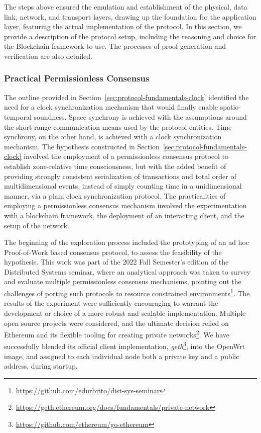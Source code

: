 The steps above ensured the emulation and establishment of the physical, data link, network, and transport layers, drawing up the foundation for the application layer, featuring the actual implementation of the \pol{} protocol. In this section, we provide a description of the protocol setup, including the reasoning and choice for the Blockchain framework to use. The processes of proof generation and verification are also detailed.

\subsubsection{Practical Permissionless Consensus} \label{sec:pol-implementation:practical-permissionless-consensus}

The outline provided in Section~\ref{sec:protocol-fundamentals-clock} identified the need for a clock synchronization mechanism that would finally enable spatio-temporal soundness. Space synchrony is achieved with the assumptions around the short-range communication means used by the protocol entities. Time synchrony, on the other hand, is achieved with a clock synchronization mechanism. The hypothesis constructed in Section~\ref{sec:protocol-fundamentals-clock} involved the employment of a permissionless consensus protocol to establish zone-relative time consciousness, but with the added benefit of providing strongly consistent serialization of transactions and total order of multidimensional events, instead of simply counting time in a unidimensional manner, via a plain clock synchronization protocol. The practicalities of employing a permissionless consensus mechanism involved the experimentation with a blockchain framework, the deployment of an interacting client, and the setup of the network.

The beginning of the exploration process included the prototyping of an ad hoc Proof-of-Work based consensus protocol, to assess the feasibility of the hypothesis. This work was part of the 2022 Fall Semester's edition of the Distributed Systems seminar, where an analytical approach was taken to survey and evaluate multiple permissionless consensus mechanisms, pointing out the challenges of porting such protocols to resource constrained environments\footnote{\url{https://github.com/edurbrito/dist-sys-seminar}}. The results of the experiment were sufficiently encouraging to warrant the development or choice of a more robust and scalable implementation. Multiple open source projects were considered, and the ultimate decision relied on Ethereum and its flexible tooling for creating private networks\footnote{\url{https://geth.ethereum.org/docs/fundamentals/private-network}}. We have successfully blended its official client implementation, \emph{geth}\footnote{\url{https://github.com/ethereum/go-ethereum}}, into the OpenWrt image, and assigned to each individual node both a private key and a public address, during startup.

